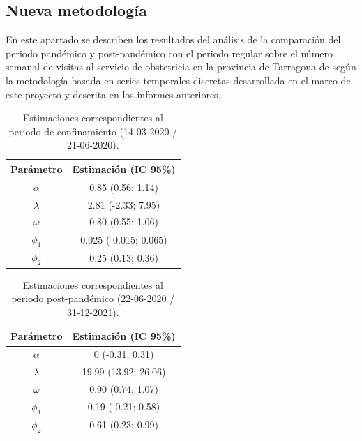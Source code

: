 \documentclass[12pt,twoside]{article} %
\begin{document}
\subsection{Nueva metodología}
En este apartado se describen los resultados del análisis de la comparación del periodo pandémico y post-pandémico con el periodo regular sobre el número semanal de visitas al servicio de obstetricia en la provincia de Tarragona de según la metodología basada en series temporales discretas desarrollada en el marco de este proyecto y descrita en los informes anteriores.

\begin{table}[H]\caption{Estimaciones correspondientes al periodo de confinamiento (14-03-2020 / 21-06-2020).}
    \centering
    \begin{tabular}{ cc }
        \hline
     \textbf{Parámetro} & \textbf{Estimación (IC 95\%)} \\ 
     \hline
     $\alpha$ & 0.85 (0.56; 1.14) \\
     $\lambda$ & 2.81 (-2.33; 7.95) \\
     $\omega$ & 0.80 (0.55; 1.06) \\
     $\phi_1$ & 0.025 (-0.015; 0.065) \\
     $\phi_2$ & 0.25 (0.13; 0.36) \\
     \hline
    \end{tabular}
  \end{table}

  \begin{table}[H]\caption{Estimaciones correspondientes al periodo post-pandémico (22-06-2020 / 31-12-2021).}
    \centering
    \begin{tabular}{ cc }
        \hline
     \textbf{Parámetro} & \textbf{Estimación (IC 95\%)} \\ 
     \hline
     $\alpha$ &  0 (-0.31; 0.31) \\
     $\lambda$ & 19.99 (13.92; 26.06) \\
     $\omega$ & 0.90 (0.74; 1.07) \\
     $\phi_1$ & 0.19 (-0.21; 0.58) \\
     $\phi_2$ & 0.61 (0.23; 0.99) \\
     \hline
    \end{tabular}
  \end{table}
\end{document}
